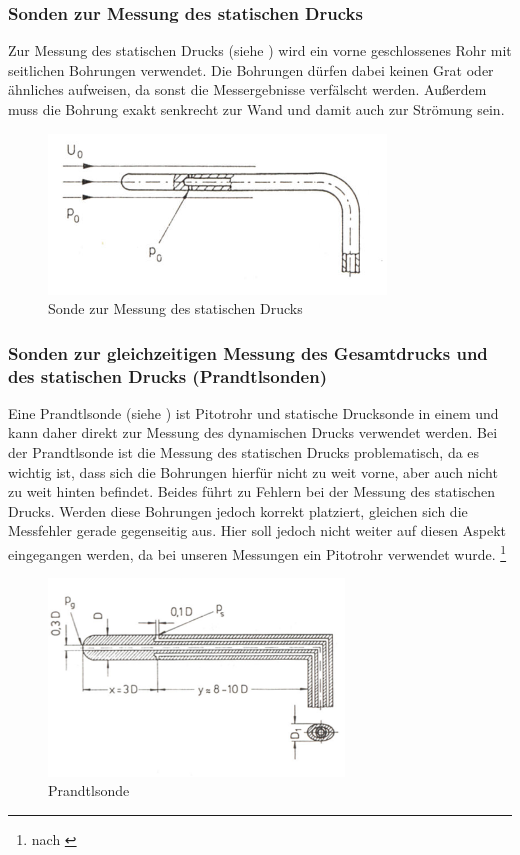 \subsubsection{Sonden zur Messung des statischen Drucks}
Zur Messung des statischen Drucks (siehe ) wird ein vorne geschlossenes Rohr mit seitlichen Bohrungen verwendet. Die Bohrungen dürfen dabei keinen Grat oder ähnliches aufweisen, da sonst die Messergebnisse verfälscht werden. Außerdem muss die Bohrung exakt senkrecht zur Wand und damit auch zur Strömung sein.
\begin{figure}
	\centering
	\includegraphics[width=0.8\textwidth]{images/statisch}
	\caption{Sonde zur Messung des statischen Drucks}
	\label{statisch}
\end{figure}

\subsubsection{Sonden zur gleichzeitigen Messung des Gesamtdrucks und des statischen Drucks (Prandtlsonden)}
Eine Prandtlsonde (siehe ) ist Pitotrohr und statische Drucksonde in einem und kann daher direkt zur Messung des dynamischen Drucks verwendet werden. Bei der Prandtlsonde ist die Messung des statischen Drucks problematisch, da es wichtig ist, dass sich die Bohrungen hierfür nicht zu weit vorne, aber auch nicht zu weit hinten befindet. Beides führt zu Fehlern bei der Messung des statischen Drucks. Werden diese Bohrungen jedoch korrekt platziert, gleichen sich die Messfehler gerade gegenseitig aus. Hier soll jedoch nicht weiter auf diesen Aspekt eingegangen werden, da bei unseren Messungen ein Pitotrohr verwendet wurde.  \footnote{nach \cite{elmann}}



\begin{figure}
	\centering
	\includegraphics[width=0.7\textwidth]{images/prandtl}
	\caption{Prandtlsonde}
	\label{prandtl}
\end{figure}